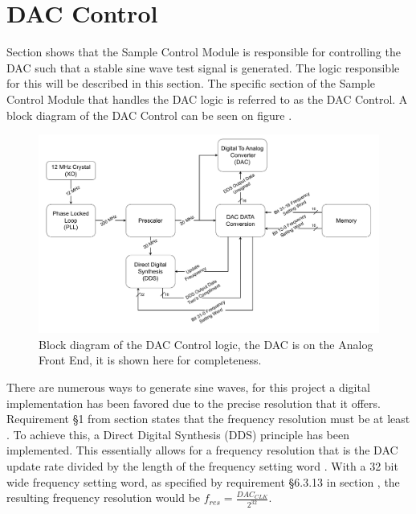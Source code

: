 \section{DAC Control} \label{subsec:DAC_CONTROL} 
Section  shows that the Sample Control Module is responsible for controlling the DAC such that a stable sine wave test signal is generated. The logic responsible for this will be described in this section. The specific section of the Sample Control Module that handles the DAC logic is referred to as the DAC Control. A block diagram of the DAC Control can be seen on figure .

\begin{figure}[H]
    \centering
    \includegraphics[clip, trim=0 0 0 0, width=1\textwidth]{Sections/7_SystemDesign/Figures/7_2_3_DAC_CONTROL.pdf}
    \caption{Block diagram of the DAC Control logic, the DAC is on the Analog Front End, it is shown here for completeness.}
    \label{fig:7_2_3_DAC_CONTROL}
\end{figure}

There are numerous ways to generate sine waves, for this project a digital implementation has been favored due to the precise resolution that it offers. Requirement §1 from section  states that the frequency resolution must be at least . To achieve this, a Direct Digital Synthesis (DDS) principle has been implemented. This essentially allows for a frequency resolution that is the DAC update rate divided by the length of the frequency setting word \cite{Fundamentals_DDS}. With a 32 bit wide frequency setting word, as specified by requirement §6.3.13 in section , the resulting frequency resolution would be $f_{res} = \frac{DAC_{CLK}}{2^{32}}$.

